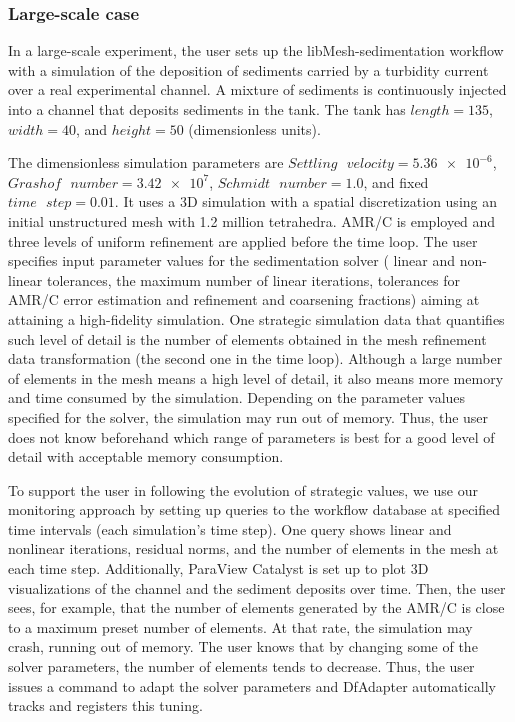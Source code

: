 \subsubsection{Large-scale case}

In a large-scale experiment, the user sets up the libMesh-sedimentation
workflow with a simulation of the deposition of sediments carried by a
turbidity current over a real experimental channel. A mixture of
sediments is continuously injected into a channel that deposits
sediments in the tank. The tank has $length = 135$, $width = 40$, and $height
= 50$ (dimensionless units).

The dimensionless simulation parameters are $Settling \text{ }  velocity =
\num{5.36e-6}$, $Grashof \text{ }  number =
\num{3.42e7}$, $Schmidt \text{ }  number = 1.0$, and fixed $time \text{ }  step =
0.01$.
It uses a 3D simulation with a spatial discretization using an
initial unstructured mesh with 1.2 million tetrahedra. AMR/C is employed
and three levels of uniform refinement are applied before the time loop.
The user specifies input parameter values for the sedimentation solver
(\ie{} linear and non-linear tolerances, the maximum number of linear
iterations, tolerances for AMR/C error estimation and refinement and
coarsening fractions) aiming at attaining a high-fidelity simulation.
One strategic simulation data that quantifies such level of detail is
the number of elements obtained in the mesh refinement data
transformation (the second one in the time loop). Although a large number of
elements in the mesh means a high level of detail, it also means more
memory and time consumed by the simulation. Depending on the parameter
values specified for the solver, the simulation may run out of memory.
Thus, the user does not know beforehand which range of parameters is
best for a good level of detail with acceptable memory consumption.

To support the user in following the evolution of strategic values, we
use our monitoring approach by setting up queries to the workflow database at specified time intervals (each simulation's time step). One query shows
linear and nonlinear iterations, residual norms, and the number of
elements in the mesh at each time step. Additionally, ParaView Catalyst
is set up to plot 3D visualizations of the channel and the sediment
deposits over time. Then, the user sees, for example, that the number of
elements generated by the AMR/C is close to a maximum preset number of
elements. At that rate, the simulation may crash, running out of memory.
The user knows that by changing some of the solver parameters, the
number of elements tends to decrease. Thus, the user issues a command to
adapt the solver parameters and DfAdapter automatically tracks and
registers this tuning.



